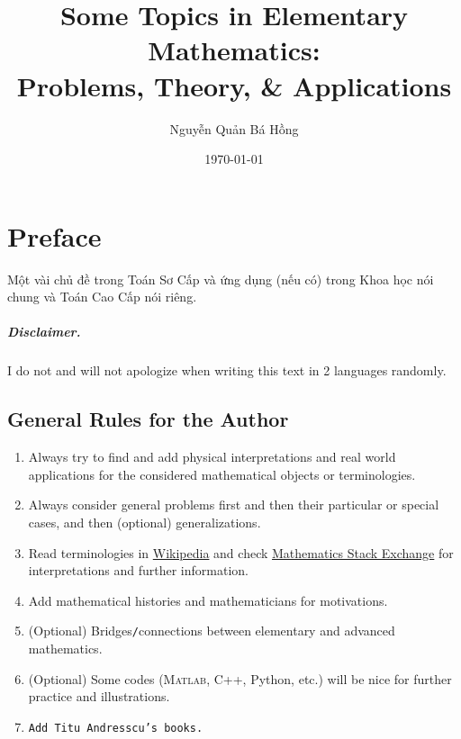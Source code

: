 \documentclass[oneside]{book}
\title{Some Topics in Elementary Mathematics:\\Problems, Theory, \& Applications}
\author{Nguyễn Quản Bá Hồng}
\date{\today}
\numberwithin{equation}{section}
\begin{document}
\maketitle
\tableofcontents


\chapter*{Preface}
Một vài chủ đề trong Toán Sơ Cấp và ứng dụng (nếu có) trong Khoa học nói chung và Toán Cao Cấp nói riêng.


\paragraph{Disclaimer.} I do not and will not apologize when writing this text in 2 languages randomly.

\section*{General Rules for the Author}
\begin{enumerate}
	\item Always try to find and add physical interpretations and real world applications for the considered mathematical objects or terminologies.
	\item Always consider general problems first and then their particular or special cases, and then (optional) generalizations.
	\item Read terminologies in \href{https://www.wikipedia.org/}{Wikipedia} and check \href{https://math.stackexchange.com/}{Mathematics Stack Exchange} for interpretations and further information.
	\item Add mathematical histories and mathematicians for motivations.
	\item (Optional) Bridges\texttt{/}connections between elementary and advanced mathematics.
	\item (Optional) Some codes (\textsc{Matlab}, C++, Python, etc.) will be nice for further practice and illustrations.
	\item \texttt{Add Titu Andresscu's books.}
\end{enumerate}
\end{document}
